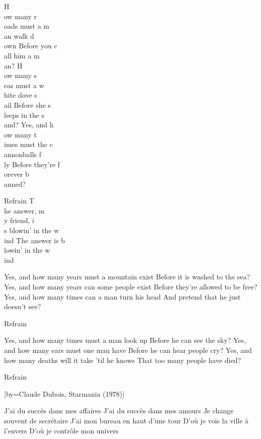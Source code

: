 \beginverse
H\\[Ré]ow many r\\[Sol]oads must a m\\[La]an walk d\\[Ré]own
Before you c\\[Sol]all him a m\\[Ré]an?
H\\[Ré]ow many s\\[Sol]eas must a w\\[La]hite dove s\\[Ré]ail
Before she s\\[Sol]leeps in the s\\[La]and?
Yes, and h\\[Ré]ow many t\\[Sol]imes must the c\\[La]annonballs f\\[Ré]ly
Before they're f\\[Sol]orever b\\[Ré]anned?
\endverse

\beginverse
Refrain
T\\[Sol]he answer, m\\[La]y friend, i\\[Ré]s blowin' in the w\\[Sol]ind
The answer is b\\[La]lowin' in the w\\[Ré]ind
\endverse

\beginverse
Yes, and how many years must a mountain exist
Before it is washed to the sea?
Yes, and how many years can some people exist
Before they're allowed to be free?
Yes, and how many times can a man turn his head
And pretend that he just doesn't see?
\endverse

\beginverse
Refrain
\endverse

\beginverse
Yes, and how many times must a man look up
Before he can see the sky?
Yes, and how many ears must one man have
Before he can hear people cry?
Yes, and how many deaths will it take 'til he knows
That too many people have died?
\endverse

\beginverse
Refrain
\endverse

[by={Claude Dubois, Starmania (1978)}]

\beginverse
J'ai du succès dans mes affaires
J'ai du succès dans mes amours
Je change souvent de secrétaire
J'ai mon bureau en haut d'une tour
D'où je vois la ville à l'envers
D'où je contrôle mon univers
\endverse

